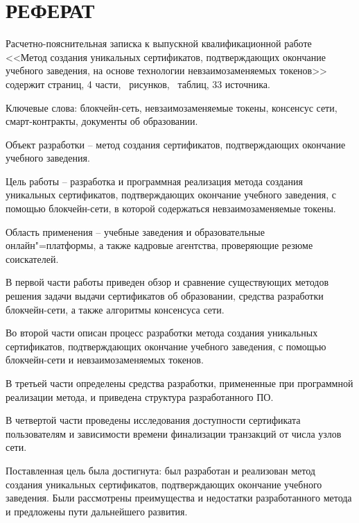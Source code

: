 \section*{РЕФЕРАТ}


Расчетно-пояснительная записка к выпускной квалификационной работе <<Метод создания уникальных сертификатов, подтверждающих окончание учебного заведения, на основе технологии невзаимозаменяемых токенов>> содержит \pageref{LastPage} страниц, 4 части, \totalfigures\ рисунков, \totaltables\ таблиц, 33 источника.

Ключевые слова: блокчейн-сеть, невзаимозаменяемые токены, консенсус сети, смарт-контракты, документы об образовании.

Объект разработки -- метод создания сертификатов, подтверждающих окончание учебного заведения.

Цель работы – разработка и программная реализация метода создания уникальных сертификатов, подтверждающих окончание учебного заведения, с помощью блокчейн-сети, в которой содержаться невзаимозаменяемые токены.

Область применения -- учебные заведения и образовательные онлайн"=платформы, а также кадровые агентства, проверяющие резюме соискателей.


В первой части работы приведен обзор и сравнение существующих методов решения задачи выдачи сертификатов об образовании, средства разработки блокчейн-сети, а также алгоритмы консенсуса сети.

Во второй части описан процесс разработки метода создания уникальных сертификатов, подтверждающих окончание учебного заведения, с помощью блокчейн-сети и невзаимозаменяемых токенов.

В третьей части определены средства разработки, примененные при программной реализации метода, и приведена структура разработанного ПО.

В четвертой части проведены исследования доступности сертификата пользователям и зависимости времени финализации транзакций от числа узлов сети.


Поставленная цель была достигнута: был разработан и реализован метод создания уникальных сертификатов, подтверждающих окончание учебного заведения. Были рассмотрены преимущества и недостатки разработанного метода и предложены пути дальнейшего развития.

\pagebreak
